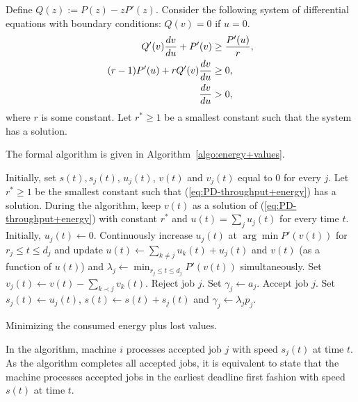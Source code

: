 \documentclass[11pt]{article}
\begin{document}
Define $Q(z) := P(z) - zP'(z)$.
Consider the following system of differential equations with 
boundary conditions: $Q(v) = 0$ if $u = 0$.
\begin{align}	\label{eq:PD-throughput+energy}
	Q'(v) \frac{dv}{du} + P'(v) &\geq \frac{P'(u)}{r},  \notag \\ 
	(r-1) P'(u) + r Q'(v) \frac{dv}{du} &\geq 0, \\
	 \frac{dv}{du} &> 0, \notag
\end{align}
where $r$ is some constant. Let $r^{*} \geq 1$ be a smallest constant such that the system has 
a solution. 

The formal algorithm is given in Algorithm~\ref{algo:energy+values}. 

\begin{algorithm}[htbp]
\begin{algorithmic}[1] 
\STATE Initially, set $s(t), s_{j}(t)$, $u_{j}(t)$, $v(t)$ and $v_{j}(t)$ equal to 0 for every $j$.
\STATE Let $r^{*} \geq 1$ be the smallest constant such that  
	(\ref{eq:PD-throughput+energy}) has a solution. During the algorithm, keep $v(t)$
	as a solution of (\ref{eq:PD-throughput+energy}) with constant $r^{*}$ and $u(t) = \sum_{j}u_{j}(t)$
	for every time $t$.
	\STATE Initially, $u_{j}(t) \gets 0$.
		\STATE Continuously increase $u_{j}(t)$ at $\arg \min P'(v(t))$  for $r_{j} \leq t \leq d_{j}$
		and update $u(t) \gets \sum_{k \neq j} u_{k}(t) + u_{j}(t)$ and $v(t)$ (as a function of $u(t)$) and
		$\lambda_{j} \gets \min_{r_{j} \leq t \leq d_{j}} P'(v(t))$ simultaneously. 
	\ENDWHILE
	\STATE Set $v_{j}(t) \gets v(t) - \sum_{k \prec j} v_{k}(t)$.
		\STATE Reject job $j$.
		\STATE Set $\gamma_{j} \gets a_{j}$.
	\ELSE
		\STATE Accept job $j$.
		\STATE Set $s_{j}(t) \gets u_{j}(t)$, $s(t) \gets s(t) + s_{j}(t)$ 
			     and $\gamma_{j} \gets \lambda_{j}p_{j}$.
	\ENDIF
\ENDFOR
\end{algorithmic}
\caption{Minimizing the consumed energy plus lost values.}
\label{algo:energy+values}
\end{algorithm}


In the algorithm, machine $i$ processes accepted job $j$ with speed $s_{j}(t)$ at time $t$.
As the algorithm completes all accepted jobs, it is equivalent to state that the machine
processes accepted jobs in the earliest deadline first fashion with speed $s(t)$ at time $t$.
\end{document}
